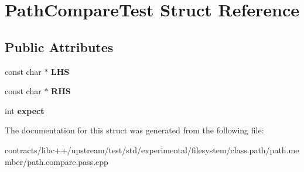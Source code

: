 \hypertarget{struct_path_compare_test}{}\section{Path\+Compare\+Test Struct Reference}
\label{struct_path_compare_test}
\subsection*{Public Attributes}
\begin{DoxyCompactItemize}
\item 
\mbox{\label{struct_path_compare_test_abc117d4beba623b1f1874455de3a12c0}} 
const char $\ast$ {\bfseries L\+HS}
\item 
\mbox{\label{struct_path_compare_test_aca631dedeafce9d6eecf3266878c0b0e}} 
const char $\ast$ {\bfseries R\+HS}
\item 
\mbox{\label{struct_path_compare_test_aa87e88cf0dc5a86e1b71120d3e6a660f}} 
int {\bfseries expect}
\end{DoxyCompactItemize}


The documentation for this struct was generated from the following file\+:\begin{DoxyCompactItemize}
\item 
contracts/libc++/upstream/test/std/experimental/filesystem/class.\+path/path.\+member/path.\+compare.\+pass.\+cpp\end{DoxyCompactItemize}
